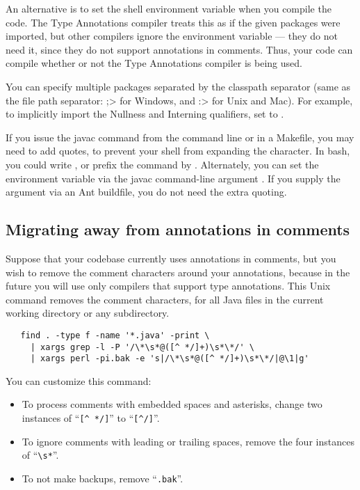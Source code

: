 An alternative is to set the shell environment variable
 when you compile the code.
The Type Annotations compiler treats this as if the given packages were
imported, but other compilers
ignore the
 environment variable --- they do not need it, since
they do not support annotations in comments.  Thus, your code can compile
whether or not the Type Annotations compiler is being used.

You can specify multiple packages separated by the classpath separator
(same as the file path separator:  \<;> for Windows, and \<:> for Unix and
Mac).  For example, to implicitly import the Nullness and Interning
qualifiers, set  to
.

If you issue the javac command from the command line or in a Makefile, you
may need to add quotes, to prevent your shell from expanding the \code{*}
character.
In bash, you could write , or prefix the 
command by  .
Alternately, you can set the environment variable via the javac
command-line argument .
If you supply the  argument via an Ant buildfile,
you do not need the extra quoting.


\subsection{Migrating away from annotations in comments\label{uncommenting-annotations}}

Suppose that your codebase currently uses annotations in comments, but you
wish to remove the comment characters around your annotations, because in
the future you will use only compilers that support type annotations.
This Unix command removes
the comment characters, for all Java files in the current
working directory or any subdirectory.

\begin{Verbatim}
   find . -type f -name '*.java' -print \
     | xargs grep -l -P '/\*\s*@([^ */]+)\s*\*/' \
     | xargs perl -pi.bak -e 's|/\*\s*@([^ */]+)\s*\*/|@\1|g'
\end{Verbatim}

You can customize this command:
\begin{itemize}
\item
To process comments with embedded spaces and asterisks, change
two instances of ``\verb|[^ */]|'' to ``\verb|[^/]|''.
\item
To ignore comments with leading or trailing spaces, remove the four
instances of ``\verb|\s*|''.
\item
  To not make backups, remove ``\verb|.bak|''.
\end{itemize}


